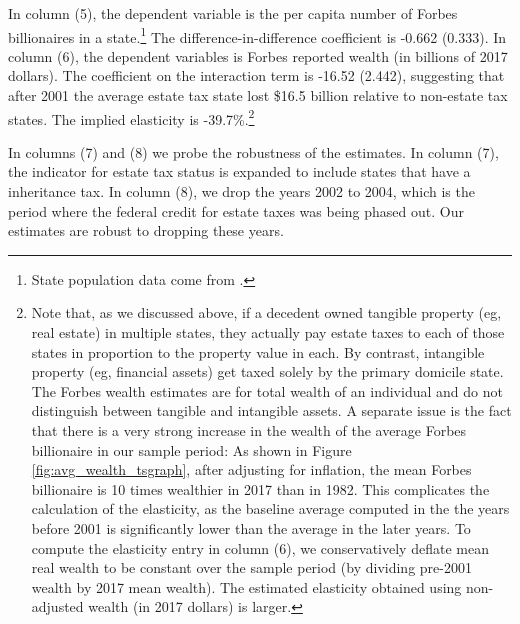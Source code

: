 \documentclass[12pt]{article}
\begin{document}
In column (5), the dependent variable is the per capita number of Forbes billionaires in a state.\footnote{State population data come from \cite{population}.} The difference-in-difference coefficient is -0.662 (0.333). 
In column (6), the dependent variables is Forbes reported wealth (in billions of 2017 dollars). 
The coefficient on the interaction term is -16.52 (2.442), suggesting that after 2001 the average estate tax state lost  \$16.5 billion relative to non-estate tax states. The implied elasticity is -39.7\%.\footnote{Note that, as we discussed above, if a decedent owned tangible property (eg, real estate) in multiple states, they actually pay estate taxes to each of those states in proportion to the property value in each. By contrast, intangible property (eg, financial assets) get taxed solely by the primary domicile state. The Forbes wealth estimates are for total wealth of an individual and do not distinguish between tangible and intangible assets. A separate issue is the fact that there is a very strong increase in the wealth of the average Forbes billionaire in our sample period: As shown in Figure \ref{fig:avg_wealth_tsgraph}, after adjusting for inflation, the mean Forbes billionaire is 10 times wealthier in 2017 than in 1982. 
This complicates the calculation of the elasticity, as the baseline average computed in the the years before 2001 is significantly lower than the average in the later years. To compute the elasticity entry in column (6), we conservatively deflate mean real wealth to be constant over the sample period (by dividing pre-2001 wealth by 2017 mean wealth).  The estimated elasticity obtained using non-adjusted wealth (in 2017 dollars) is larger.} 

In columns (7) and (8) we probe the robustness of the estimates. In column (7), the indicator for estate tax status is expanded to include states that have a inheritance tax. In column (8), we drop the years 2002 to 2004, which is the period where the federal credit  for estate taxes was being phased out. Our estimates are robust to dropping these years. 
\end{document}
